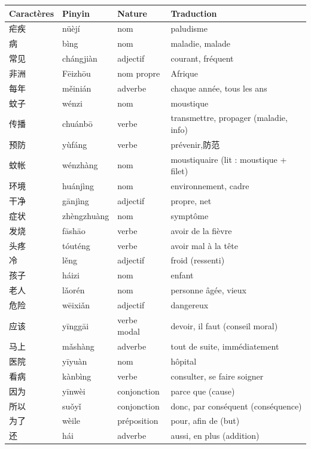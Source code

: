 \documentclass[11pt]{article}
\begin{document}
\begin{center}
\begin{tabularx}{\linewidth}{|X|X|X|X|}
\hline
\rowcolor{popblueL} \textbf{Caractères} & \textbf{Pinyin} & \textbf{Nature} & \textbf{Traduction} \\
\hline
疟疾 & nüèjí & nom & paludisme \\
\hline
病 & bìng & nom & maladie, malade \\
\hline
常见 & chángjiàn & adjectif & courant, fréquent \\
\hline
非洲 & Fēizhōu & nom propre & Afrique \\
\hline
每年 & měinián & adverbe & chaque année, tous les ans \\
\hline
蚊子 & wénzi & nom & moustique \\
\hline
传播 & chuánbō & verbe & transmettre, propager (maladie, info) \\
\hline
预防 & yùfáng & verbe & prévenir,防范 \\
\hline
蚊帐 & wénzhàng & nom & moustiquaire (lit : moustique + filet) \\
\hline
环境 & huánjìng & nom & environnement, cadre \\
\hline
干净 & gānjìng & adjectif & propre, net \\
\hline
症状 & zhèngzhuàng & nom & symptôme \\
\hline
发烧 & fāshāo & verbe & avoir de la fièvre \\
\hline
头疼 & tóuténg & verbe & avoir mal à la tête \\
\hline
冷 & lěng & adjectif & froid (ressenti) \\
\hline
孩子 & háizi & nom & enfant \\
\hline
老人 & lǎorén & nom & personne âgée, vieux \\
\hline
危险 & wēixiǎn & adjectif & dangereux \\
\hline
应该 & yīnggāi & verbe modal & devoir, il faut (conseil moral) \\
\hline
马上 & mǎshàng & adverbe & tout de suite, immédiatement \\
\hline
医院 & yīyuàn & nom & hôpital \\
\hline
看病 & kànbìng & verbe & consulter, se faire soigner \\
\hline
因为 & yīnwèi & conjonction & parce que (cause) \\
\hline
所以 & suǒyǐ & conjonction & donc, par conséquent (conséquence) \\
\hline
为了 & wèile & préposition & pour, afin de (but) \\
\hline
还 & hái & adverbe & aussi, en plus (addition) \\
\hline
\end{tabularx}
\end{center}
\end{document}
